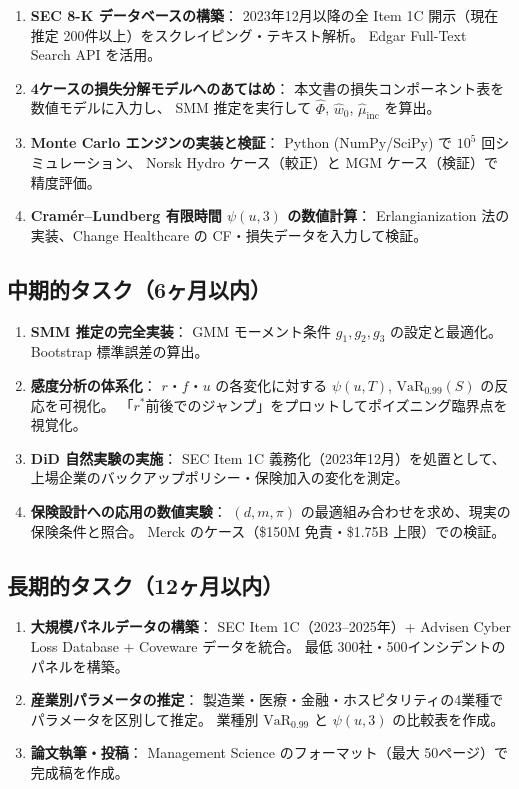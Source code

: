 \documentclass[a4paper,11pt]{article}
\newcommand{\VaR}{\mathrm{VaR}}
\newcommand{\ruin}{\psi}
\theoremstyle{definition}
\begin{document}
\begin{enumerate}[leftmargin=1.5em, itemsep=4pt]
  \item \textbf{SEC 8-K データベースの構築}：
  2023年12月以降の全 Item 1C 開示（現在推定 200件以上）をスクレイピング・テキスト解析。
  Edgar Full-Text Search API を活用。
  \item \textbf{4ケースの損失分解モデルへのあてはめ}：
  本文書の損失コンポーネント表を数値モデルに入力し、
  SMM 推定を実行して $\hat{\Phi}$, $\hat{w}_0$, $\hat{\mu}_{\mathrm{inc}}$ を算出。
  \item \textbf{Monte Carlo エンジンの実装と検証}：
  Python (NumPy/SciPy) で $10^5$ 回シミュレーション、
  Norsk Hydro ケース（較正）と MGM ケース（検証）で精度評価。
  \item \textbf{Cramér--Lundberg 有限時間 $\ruin(u,3)$ の数値計算}：
  Erlangianization 法の実装、Change Healthcare の CF・損失データを入力して検証。
\end{enumerate}

\subsection{中期的タスク（6ヶ月以内）}

\begin{enumerate}[leftmargin=1.5em, itemsep=4pt]
  \item \textbf{SMM 推定の完全実装}：
  GMM モーメント条件 $g_1, g_2, g_3$ の設定と最適化。
  Bootstrap 標準誤差の算出。
  \item \textbf{感度分析の体系化}：
  $r$・$f$・$u$ の各変化に対する $\ruin(u,T)$, $\VaR_{0.99}(S)$ の反応を可視化。
  「$r^*$前後でのジャンプ」をプロットしてポイズニング臨界点を視覚化。
  \item \textbf{DiD 自然実験の実施}：
  SEC Item 1C 義務化（2023年12月）を処置として、
  上場企業のバックアップポリシー・保険加入の変化を測定。
  \item \textbf{保険設計への応用の数値実験}：
  $(d, m, \pi)$ の最適組み合わせを求め、現実の保険条件と照合。
  Merck のケース（\$150M 免責・\$1.75B 上限）での検証。
\end{enumerate}

\subsection{長期的タスク（12ヶ月以内）}

\begin{enumerate}[leftmargin=1.5em, itemsep=4pt]
  \item \textbf{大規模パネルデータの構築}：
  SEC Item 1C（2023--2025年）+ Advisen Cyber Loss Database + Coveware データを統合。
  最低 300社・500インシデントのパネルを構築。
  \item \textbf{産業別パラメータの推定}：
  製造業・医療・金融・ホスピタリティの4業種でパラメータを区別して推定。
  業種別 $\VaR_{0.99}$ と $\ruin(u,3)$ の比較表を作成。
  \item \textbf{論文執筆・投稿}：
  Management Science のフォーマット（最大 50ページ）で完成稿を作成。
\end{enumerate}
\end{document}
